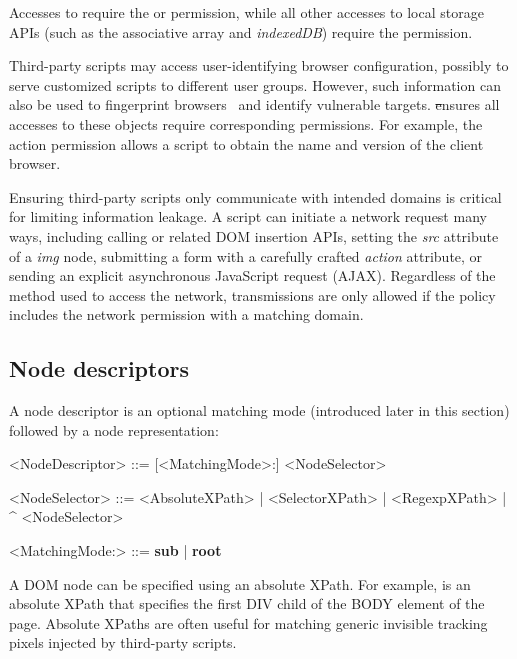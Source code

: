  Accesses to  require
the  or  permission, while all other
accesses to local storage APIs (such as the 
associative array and \emph{indexedDB}) require the 
permission.

 Third-party scripts may access
user-identifying browser configuration, possibly to serve
customized scripts to different user groups.  However, such information can also be used to fingerprint
browsers~\cite{FPDetective} and identify vulnerable targets.  \st ensures all accesses to
these objects require corresponding permissions.  For example, the
 action permission allows a script to obtain
the name and version of the client browser.

 Ensuring third-party scripts only communicate
with intended domains is critical for limiting information leakage.  A
script can initiate a network request many ways, including calling
 or related DOM insertion APIs, setting the
\emph{src} attribute of a \emph{img} node, submitting a form with a
carefully crafted \emph{action} attribute, or sending an explicit
asynchronous JavaScript request (AJAX).  Regardless of the method used
to access the network, transmissions are only allowed if the policy
includes the network permission with a matching domain.

\subsection{Node descriptors}
\label{sec:DOMNodeDescriptor}

A node descriptor is an optional matching mode (introduced later in this section)
followed by a node representation:

\begin{grammar}
<NodeDescriptor> ::= [<MatchingMode>:] <NodeSelector>

<NodeSelector> ::= <AbsoluteXPath> | <SelectorXPath> | <RegexpXPath> 
                   | {\bf \textasciicircum} <NodeSelector>

<MatchingMode:> ::= {\bf sub} | {\bf root}
\end{grammar}

 A DOM node can be specified using an
absolute XPath.  For example,  is an
absolute XPath that specifies the first DIV child of the BODY element of
the page.  Absolute XPaths are often useful for matching generic invisible
tracking pixels injected by third-party scripts.

